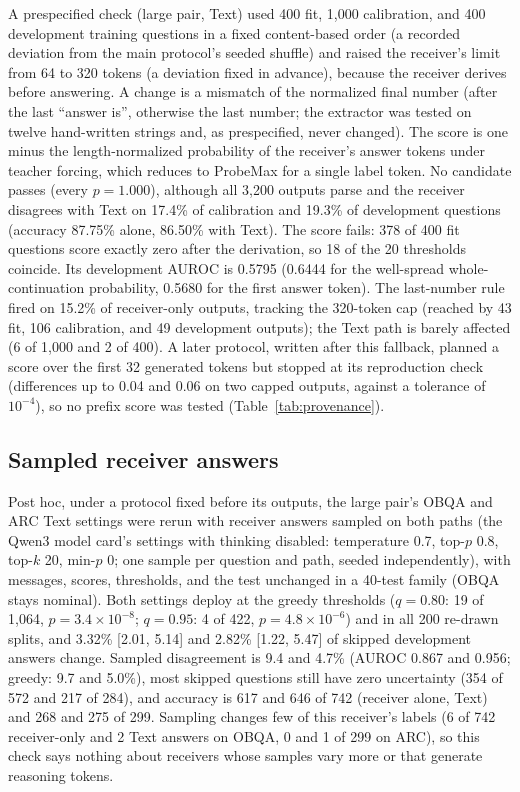 A prespecified check (large pair, Text) used 400 fit, 1,000 calibration, and 400 development training questions in a fixed content-based order (a recorded deviation from the main protocol's seeded shuffle) and raised the receiver's limit from 64 to 320 tokens (a deviation fixed in advance), because the receiver derives before answering. A change is a mismatch of the normalized final number (after the last ``answer is'', otherwise the last number; the extractor was tested on twelve hand-written strings and, as prespecified, never changed). The score is one minus the length-normalized probability of the receiver's answer tokens under teacher forcing, which reduces to ProbeMax for a single label token. No candidate passes (every $p=1.000$), although all 3,200 outputs parse and the receiver disagrees with Text on 17.4\% of calibration and 19.3\% of development questions (accuracy 87.75\% alone, 86.50\% with Text). The score fails: 378 of 400 fit questions score exactly zero after the derivation, so 18 of the 20 thresholds coincide. Its development AUROC is 0.5795 (0.6444 for the well-spread whole-continuation probability, 0.5680 for the first answer token). The last-number rule fired on 15.2\% of receiver-only outputs, tracking the 320-token cap (reached by 43 fit, 106 calibration, and 49 development outputs); the Text path is barely affected (6 of 1,000 and 2 of 400). A later protocol, written after this fallback, planned a score over the first 32 generated tokens but stopped at its reproduction check (differences up to 0.04 and 0.06 on two capped outputs, against a tolerance of $10^{-4}$), so no prefix score was tested (Table~\ref{tab:provenance}).

\subsection{Sampled receiver answers}\label{app:sampling}

Post hoc, under a protocol fixed before its outputs, the large pair's OBQA and ARC Text settings were rerun with receiver answers sampled on both paths (the Qwen3 model card's settings with thinking disabled: temperature 0.7, top-$p$ 0.8, top-$k$ 20, min-$p$ 0; one sample per question and path, seeded independently), with messages, scores, thresholds, and the test unchanged in a 40-test family (OBQA stays nominal). Both settings deploy at the greedy thresholds ($q=0.80$: 19 of 1,064, $p=3.4\times10^{-8}$; $q=0.95$: 4 of 422, $p=4.8\times10^{-6}$) and in all 200 re-drawn splits, and 3.32\% [2.01, 5.14] and 2.82\% [1.22, 5.47] of skipped development answers change. Sampled disagreement is 9.4 and 4.7\% (AUROC 0.867 and 0.956; greedy: 9.7 and 5.0\%), most skipped questions still have zero uncertainty (354 of 572 and 217 of 284), and accuracy is 617 and 646 of 742 (receiver alone, Text) and 268 and 275 of 299. Sampling changes few of this receiver's labels (6 of 742 receiver-only and 2 Text answers on OBQA, 0 and 1 of 299 on ARC), so this check says nothing about receivers whose samples vary more or that generate reasoning tokens.

